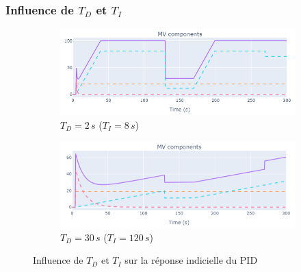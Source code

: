 \subsubsection{Influence de \texorpdfstring{$T_D$}{Td} et \texorpdfstring{$T_I$}{Ti}}
\begin{figure}[H]
    \centering
    \begin{subfigure}[b]{0.48\textwidth}
        \includegraphics[width=\textwidth]{../Plots/PID/PID_Response_low_Td.png}
        \caption{$T_D = 2\,s$ ($T_I = 8\,s$)}
    \end{subfigure}
    \begin{subfigure}[b]{0.48\textwidth}
        \includegraphics[width=\textwidth]{../Plots/PID/PID_Response_high_Td.png}
        \caption{$T_D = 30\,s$ ($T_I = 120\,s$)}
    \end{subfigure}
    \caption{Influence de $T_D$ et $T_I$ sur la réponse indicielle du PID}
    \label{fig:Td_Influence_PID}
\end{figure}

